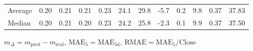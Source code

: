 \begin{threeparttable}
{\begin{tabular}{lrrrrrrrrrrr}
Average &          0.20 &          0.21 &          0.21 &        0.23 &                24.1 &                29.8 &       -5.7 &                 0.2 &              9.8 &            0.37 &                  37.83 \\
 Median &          0.20 &          0.21 &          0.20 &        0.23 &                24.2 &                25.8 &       -2.3 &                 0.1 &              9.9 &            0.37 &                  37.50 \\
\bottomrule
\end{tabular}
}
\begin{tablenotes}\footnotesize
\item $m_\Delta=m_{\text{pred}}-m_{\text{real}}$,
$\mathrm{MAE}_5=\mathrm{MAE}_{5\text{d}}$,
$\mathrm{RMAE}=\mathrm{MAE}_5/\text{Close}$
\end{tablenotes}
\end{threeparttable}
\endgroup

